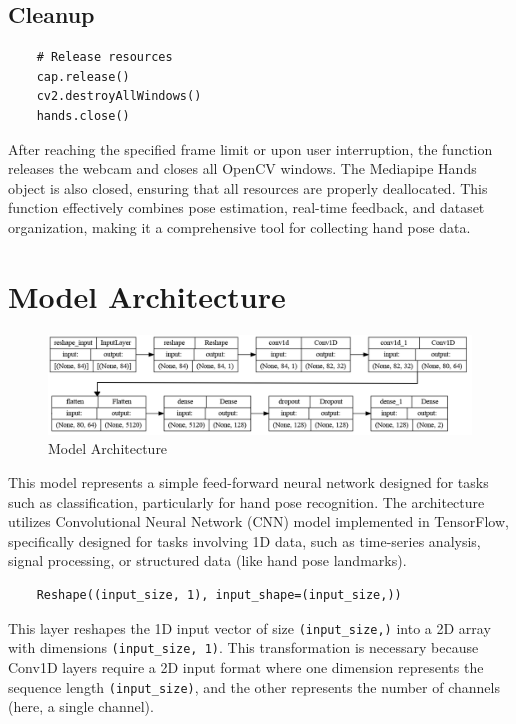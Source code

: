 \subsection{Cleanup}
\begin{lstlisting}
	# Release resources
	cap.release()
	cv2.destroyAllWindows()
	hands.close()
\end{lstlisting}
After reaching the specified frame limit or upon user interruption, the function releases the webcam and closes all OpenCV windows. The Mediapipe Hands object is also closed, ensuring that all resources are properly deallocated. This function effectively combines pose estimation, real-time feedback, and dataset organization, making it a comprehensive tool for collecting hand pose data.
\section{Model Architecture}

\begin{figure}[h]
	\centering
	\includegraphics[width=\linewidth]{img/model_architecture} %
	\caption{Model Architecture}
	\label{fig:model_architecture} %
\end{figure}

This model represents a simple feed-forward neural network designed for tasks such as classification, particularly for hand pose recognition. The architecture utilizes Convolutional Neural Network (CNN) model implemented in TensorFlow, specifically designed for tasks involving 1D data, such as time-series analysis, signal processing, or structured data (like hand pose landmarks).

\begin{lstlisting}
	Reshape((input_size, 1), input_shape=(input_size,))
\end{lstlisting}

This layer reshapes the 1D input vector of size \verb|(input_size,)| into a 2D array with dimensions \verb|(input_size, 1)|. This transformation is necessary because Conv1D layers require a 2D input format where one dimension represents the sequence length \verb|(input_size)|, and the other represents the number of channels (here, a single channel).

